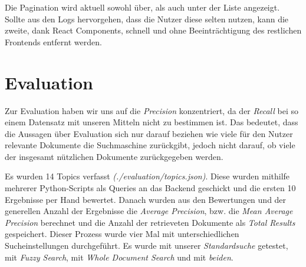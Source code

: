 \documentclass[oneside, a4paper, 12pt, titlepage]{article}
\begin{document}
Die Pagination wird aktuell sowohl über, als auch unter der Liste angezeigt. Sollte aus den Logs hervorgehen, dass die Nutzer diese selten nutzen, kann die zweite, dank React Components, schnell und ohne Beeinträchtigung des restlichen Frontends entfernt werden.\\

\section{Evaluation}
Zur Evaluation haben wir uns auf die \textit{Precision} konzentriert, da der \textit{Recall} bei so einem Datensatz mit unseren Mitteln nicht zu bestimmen ist. Das bedeutet, dass die Aussagen über Evaluation sich nur darauf beziehen wie viele für den Nutzer relevante Dokumente die Suchmaschine zurückgibt, jedoch nicht darauf, ob viele der insgesamt nützlichen Dokumente zurückgegeben werden.

Es wurden 14 Topics verfasst \textit{(./evaluation/topics.json)}. Diese wurden mithilfe mehrerer Python-Scripts als Queries an das Backend geschickt und die ersten 10 Ergebnisse per Hand bewertet. Danach wurden aus den Bewertungen und der generellen Anzahl der Ergebnisse die \textit{Average Precision}, bzw. die \textit{Mean Average Precision} berechnet und die Anzahl der retrieveten Dokumente als \textit{Total Results} gespeichert. Dieser Prozess wurde vier Mal mit unterschiedlichen Sucheinstellungen durchgeführt. Es wurde mit unserer \textit{Standardsuche} getestet, mit \textit{Fuzzy Search}, mit \textit{Whole Document Search} und mit \textit{beiden}. \\
\end{document}
